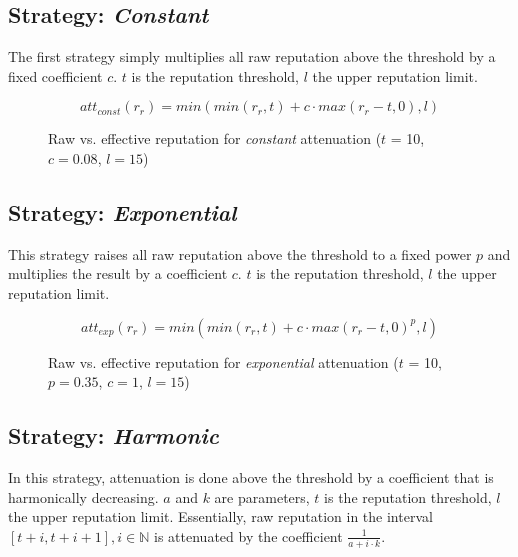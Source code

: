 \subsection{Strategy: \emph{Constant}}
The first strategy simply multiplies all raw reputation above the threshold by a
fixed coefficient $c$. $t$ is the reputation threshold, $l$ the upper reputation
limit.

\[att_{const}(r_r) = min(min(r_r, t) + c \cdot max(r_r - t, 0), l)\]

\begin{figure}[t]
\centering
{}
\caption{Raw vs. effective reputation for \emph{constant} attenuation ($t$ = 10,
$c = 0.08$, $l = 15$)}
\label{fig:att_const_raw_vs_eff}
\end{figure}

\subsection{Strategy: \emph{Exponential}}
This strategy raises all raw reputation above the threshold to a fixed power $p$
and multiplies the result by a coefficient $c$. $t$ is the reputation threshold,
$l$ the upper reputation limit.

\[att_{exp}(r_r) = min(min(r_r, t) + c \cdot max(r_r - t, 0)^p, l)\]

\begin{figure}[t]
\centering
{}
\caption{Raw vs. effective reputation for \emph{exponential} attenuation ($t$ =
10, $p = 0.35$, $c = 1$, $l = 15$)}
\label{fig:att_exp_raw_vs_eff}
\end{figure}

\subsection{Strategy: \emph{Harmonic}}
In this strategy, attenuation is done above the threshold by a coefficient that
is harmonically decreasing. $a$ and $k$ are parameters, $t$ is the reputation
threshold, $l$ the upper reputation limit. Essentially, raw reputation in the
interval $[t + i, t + i + 1], i \in \mathbb{N}$ is attenuated by the coefficient
$\frac{1}{a + i \cdot k}$.


